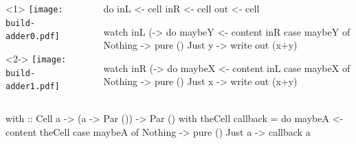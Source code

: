 \documentclass[UKenglish,usenames,dvipsnames,svgnames,table,aspectratio=169,mathserif]{beamer}
\newcommand{\nl}{\vspace{\baselineskip}}
\newcommand{\pnl}{\pause \nl}
\begin{document}
\begin{frame}[fragile]
\centering


\begin{columns}
\begin{column}{0.5\textwidth}
\begin{overlayarea}{0.5\textwidth}{0.4\textheight}
\begin{onlyenv}<1>
\texttt{[image: build-adder0.pdf]}
\end{onlyenv}
\begin{onlyenv}<2->
\texttt{[image: build-adder1.pdf]}
\end{onlyenv}
\end{overlayarea}
\end{column}
\begin{column}{0.5\textwidth}
\begin{haskellcode}
do
  inL  <- cell
  inR  <- cell
  out  <- cell
\end{haskellcode}
\pnl
\begin{haskellcode}
  watch inL (\x -> do
    maybeY <- content inR
    case maybeY of
      Nothing -> pure ()
      Just y  -> write out (x+y)
\end{haskellcode}
\pnl
\begin{haskellcode}
  watch inR (\y -> do
    maybeX <- content inL
    case maybeX of
      Nothing -> pure ()
      Just x  -> write out (x+y)
\end{haskellcode}
\end{column}
\end{columns}
\end{frame}


\begin{frame}[fragile]
\begin{haskellcode}
          with :: Cell a -> (a -> Par ()) -> Par ()
          with theCell callback = do
            maybeA <- content theCell
              case maybeA of
                Nothing -> pure ()
                Just a  -> callback a
\end{haskellcode}
\end{frame}
\end{document}
